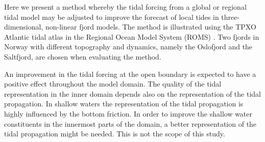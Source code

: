 Here we present a method whereby the tidal forcing from a global or regional tidal model may be adjusted to improve the forecast of local tides in three-dimensional, non-linear fjord models. The method is illustrated using the TPXO Atlantic tidal atlas \citep{egbert94,egbert02} in the Regional Ocean Model System (ROMS) \citep{shchepetkin05,shchepetkin09,haidvogel08}. Two fjords in Norway with different topography and dynamics, namely the Oslofjord and the Saltfjord, are chosen when evaluating the method.

An improvement in the tidal forcing at the open boundary is expected to have a positive effect throughout the model domain. The quality of the tidal representation in the inner domain depends also on the representation of the tidal propagation. In shallow waters the representation of the tidal propagation is highly influenced by the bottom friction. In order to improve the shallow water constituents in the innermost parts of the domain, a better representation of the tidal propagation might be needed. This is not the scope of this study. 

